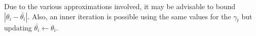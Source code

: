 \documentclass[12pt,leqno]{article}
\begin{document}
Due to the various approximations involved, it may be advisable to bound $|\theta_i-\bar{\theta_i}|$.  Also, an
inner iteration is possible using the same values for the $\gamma_t$ but updating $\bar{\theta_i} \leftarrow \theta_i$.






\end{document}
